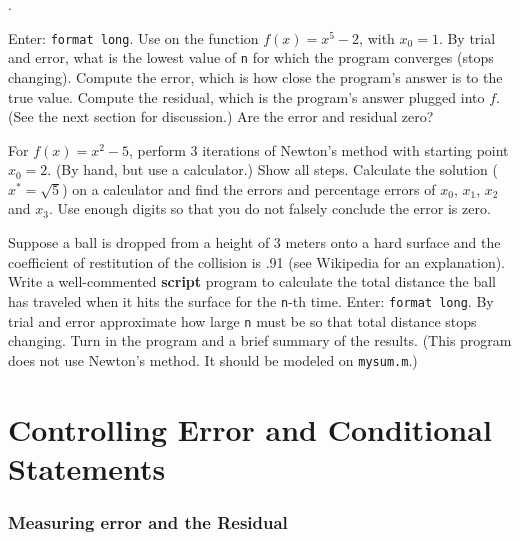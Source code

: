 \nobreak \begin{list}
{.}{}


   
\item Enter: \verb&format long&.  Use  on the function
  $f(x) = x^5 - 2$, with $x_0 = 1$. By trial and error, what is the
  lowest value of \verb&n& for which the program converges (stops
  changing). Compute the error, which is how close the program's
  answer is to the true value. Compute the residual, which is the
  program's answer plugged into $f$. (See the next section for discussion.) 
  Are the error and residual zero?
   
\item For $f(x) = x^2 - 5$, perform 3 iterations of Newton's method
  with starting point $x_0 = 2$. (By hand, but use a calculator.) Show all
  steps.
  Calculate the solution ($x^* = \sqrt{5}$) on a calculator and find
  the errors and percentage errors of $x_0$, $x_1$, $x_2$ and $x_3$.
  Use enough digits so that you do not falsely conclude the error is
  zero. 
  \label{exr:newtonbyhand}


\item Suppose a ball is dropped from a height of 3 meters onto a hard
  surface and the coefficient of restitution of the collision is .91
  (see Wikipedia for an explanation).  Write a well-commented {\bf
    script} program to calculate the total distance the ball has
  traveled when it hits the surface for the \verb&n&-th time.  Enter:
  \verb&format long&. By trial and error approximate how large
  \verb&n& must be so that total distance stops changing. Turn in the
  program and a brief summary of the results. (This program does not
  use Newton's method. It should be modeled on \verb&mysum.m&.)
  \label{exr:bounce}


\end{list}





\chapter{Controlling Error and Conditional Statements}


\subsection*{Measuring error and the Residual}

